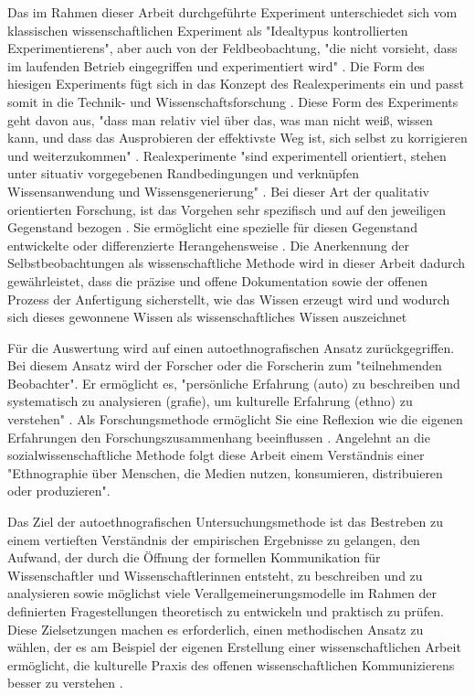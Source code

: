 Das im Rahmen dieser Arbeit durchgeführte Experiment unterschiedet sich vom klassischen wissenschaftlichen Experiment als "Idealtypus kontrollierten Experimentierens", aber auch von der Feldbeobachtung, "die nicht vorsieht, dass im laufenden Betrieb eingegriffen und experimentiert wird" \cite{Westermayer_2006}. Die Form des hiesigen Experiments fügt sich in das Konzept des Realexperiments ein und passt somit in die Technik- und Wissenschaftsforschung \cite{Westermayer_2006}. Diese Form des Experiments geht davon aus, "dass man relativ viel über das, was man nicht weiß, wissen kann, und dass das Ausprobieren der effektivste Weg ist, sich selbst zu korrigieren und weiterzukommen" \cite{Krohn_2005}. Realexperimente "sind experimentell orientiert, stehen unter situativ vorgegebenen Randbedingungen und verknüpfen Wissensanwendung und Wissensgenerierung" \cite{Westermayer_2006}. Bei dieser Art der qualitativ orientierten Forschung, ist das Vorgehen sehr spezifisch und auf den jeweiligen Gegenstand bezogen \cite{Krohn_2005}. Sie ermöglicht eine spezielle für diesen Gegenstand entwickelte oder differenzierte Herangehensweise \cite[:119]{Mayring_1999}. Die Anerkennung der Selbstbeobachtungen als wissenschaftliche Methode wird in dieser Arbeit dadurch gewährleistet, dass die präzise und offene Dokumentation sowie der offenen Prozess der Anfertigung sicherstellt, wie das Wissen erzeugt wird und wodurch sich dieses gewonnene Wissen als wissenschaftliches Wissen auszeichnet \cite{solhdju_2011_selbstexperimente}

Für die Auswertung wird auf einen autoethnografischen Ansatz zurückgegriffen. Bei diesem Ansatz wird der Forscher oder die Forscherin zum "teilnehmenden Beobachter"\cite{Ellis_2010}. Er ermöglicht es, "persönliche Erfahrung (auto) zu beschreiben und systematisch zu analysieren (grafie), um kulturelle Erfahrung (ethno) zu verstehen" \cite{Ellis_2010}. Als Forschungsmethode ermöglicht Sie eine Reflexion wie die eigenen Erfahrungen den Forschungszusammenhang beeinflussen \cite{ellis_2011_autoethnography}. Angelehnt an die sozialwissenschaftliche Methode folgt diese Arbeit einem Verständnis einer "Ethnographie über Menschen, die Medien nutzen, konsumieren, distribuieren oder produzieren"\cite{bachmann_2011_ethnographie}.

Das Ziel der autoethnografischen Untersuchungsmethode ist das Bestreben zu einem vertieften Verständnis der empirischen Ergebnisse zu gelangen, den Aufwand, der durch die Öffnung der formellen Kommunikation für Wissenschaftler und Wissenschaftlerinnen entsteht, zu beschreiben und zu analysieren sowie möglichst viele Verallgemeinerungsmodelle im Rahmen der definierten Fragestellungen theoretisch zu entwickeln und praktisch zu prüfen. Diese Zielsetzungen machen es erforderlich, einen methodischen Ansatz zu wählen, der es am Beispiel der eigenen Erstellung einer wissenschaftlichen Arbeit ermöglicht, die kulturelle Praxis des offenen wissenschaftlichen Kommunizierens besser zu verstehen \cite{maso_2001_phenomenology}.


